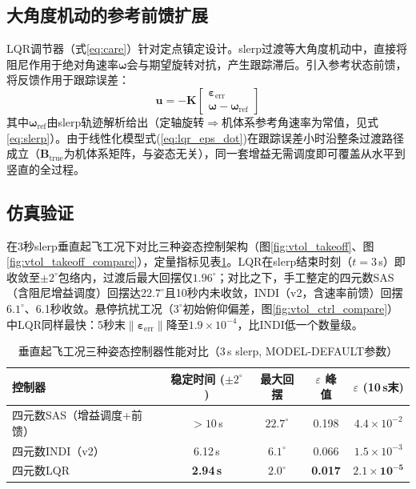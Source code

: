 \subsection{大角度机动的参考前馈扩展}
\label{sec:lqr_ff}

LQR调节器（式\ref{eq:care}）针对定点镇定设计。slerp过渡等大角度机动中，直接将阻尼作用于绝对角速率$\boldsymbol{\omega}$会与期望旋转对抗，产生跟踪滞后。引入参考状态前馈，将反馈作用于跟踪误差：
\begin{equation}
    \mathbf{u} = -\mathbf{K}\begin{bmatrix} \boldsymbol{\varepsilon}_{\mathrm{err}} \\ \boldsymbol{\omega} - \boldsymbol{\omega}_{\mathrm{ref}} \end{bmatrix}
    \label{eq:lqr_tracking}
\end{equation}
其中$\boldsymbol{\omega}_{\mathrm{ref}}$由slerp轨迹解析给出（定轴旋转$\Rightarrow$机体系参考角速率为常值，见式\ref{eq:slerp}）。由于线性化模型式(\ref{eq:lqr_eps_dot})在跟踪误差小时沿整条过渡路径成立（$\mathbf{B}_{\mathrm{true}}$为机体系矩阵，与姿态无关），同一套增益无需调度即可覆盖从水平到竖直的全过程。

\subsection{仿真验证}
\label{sec:lqr_sim}

在3秒slerp垂直起飞工况下对比三种姿态控制架构（图\ref{fig:vtol_takeoff}、图\ref{fig:vtol_takeoff_compare}），定量指标见表\ref{tab:ctrl_compare}。LQR在slerp结束时刻（$t=3$\,s）即收敛至$\pm2^\circ$包络内，过渡后最大回摆仅$1.96^\circ$；对比之下，手工整定的四元数SAS（含阻尼增益调度）回摆达$22.7^\circ$且10秒内未收敛，INDI（v2，含速率前馈）回摆$6.1^\circ$、6.1秒收敛。悬停抗扰工况（$3^\circ$初始俯仰偏差，图\ref{fig:vtol_ctrl_compare}）中LQR同样最快：5秒末$\|\boldsymbol{\varepsilon}_{\mathrm{err}}\|$降至$1.9\times10^{-4}$，比INDI低一个数量级。

\begin{table}[H]
\centering
\caption{垂直起飞工况三种姿态控制器性能对比（3\,s slerp, MODEL-DEFAULT参数）}
\label{tab:ctrl_compare}
\small
\begin{tabular}{l c c c c}
\toprule
\textbf{控制器} & \textbf{稳定时间 ($\pm2^\circ$)} & \textbf{最大回摆} & \textbf{$\varepsilon$ 峰值} & \textbf{$\varepsilon$ (10\,s末)} \\
\midrule
四元数SAS（增益调度+前馈） & $>10$\,s & $22.7^\circ$ & 0.198 & $4.4\times10^{-2}$ \\
四元数INDI（v2） & 6.12\,s & $6.1^\circ$ & 0.066 & $1.5\times10^{-3}$ \\
四元数LQR & \textbf{2.94\,s} & $\mathbf{2.0^\circ}$ & \textbf{0.017} & $\mathbf{2.1\times10^{-5}}$ \\
\bottomrule
\end{tabular}
\end{table}

